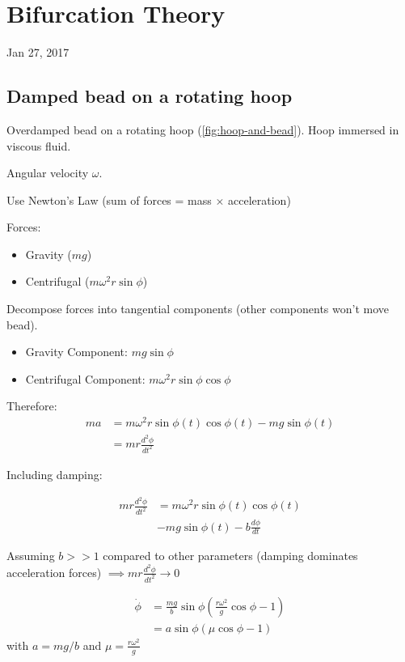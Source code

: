 \documentclass[main.tex]{subfiles}
\begin{document}
\section{Bifurcation Theory}

Jan 27, 2017

\vspace{3mm}
\subsection{Damped bead on a rotating hoop}
Overdamped bead on a rotating hoop (\ref{fig:hoop-and-bead}). Hoop immersed in viscous fluid.

Angular velocity $\omega$.

Use Newton's Law (sum of forces = mass $\times$ acceleration)

Forces:
\begin{itemize}
    \item Gravity ($mg$)
    \item Centrifugal ($m\omega^2 r\sin{\phi}$)
\end{itemize}

Decompose forces into tangential components (other components won't move bead).

\begin{itemize}
    \item Gravity Component: $mg\sin{\phi}$
    \item Centrifugal Component: $m\omega^2r\sin{\phi}\cos{\phi}$
\end{itemize}

Therefore:
\begin{align}
ma &= m\omega^2r\sin{\phi(t)}\cos{\phi(t)} - mg\sin{\phi(t)} \\
&= mr\frac{d^2\phi}{dt^2}
\end{align}

Including damping:

\begin{align}
mr\frac{d^2\phi}{dt^2} &= m\omega^2 r\sin{\phi(t)}\cos{\phi(t)} \\
                       &- mg\sin{\phi(t)} - b\frac{d\phi}{dt}
\end{align}

Assuming $b >> 1$ compared to other parameters (damping dominates acceleration forces) $\implies mr\frac{d^2\phi}{dt^2} \rightarrow 0$

\begin{align}
\dot{\phi} &= \frac{mg}{b}\sin{\phi}\left(\frac{r\omega^2}{g}\cos{\phi} - 1\right) \\
           &= a\sin{\phi}\left(\mu\cos{\phi} - 1\right)
\end{align}
with $a = mg/b$ and $\mu=\frac{r\omega^2}{g}$
\end{document}
